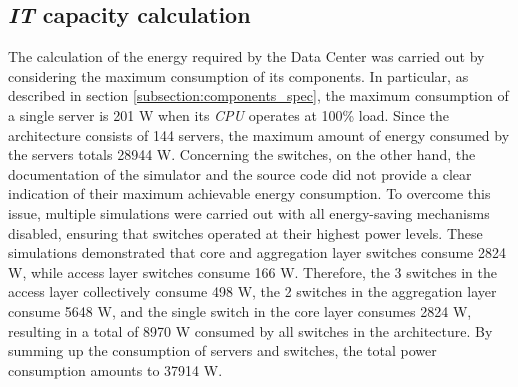 \subsection{\emph{IT} capacity calculation} \label{subsection:it_capacity}
The calculation of the energy required by the Data Center was carried out by considering the maximum consumption of its components. In particular, as described in section \ref{subsection:components_spec}, the maximum consumption of a single server is 201 W when its \emph{CPU} operates at 100\% load. Since the architecture consists of 144 servers, the maximum amount of energy consumed by the servers totals 28944 W. Concerning the switches, on the other hand, the documentation of the simulator and the source code did not provide a clear indication of their maximum achievable energy consumption. To overcome this issue, multiple simulations were carried out with all energy-saving mechanisms disabled, ensuring that switches operated at their highest power levels. These simulations demonstrated that core and aggregation layer switches consume 2824 W, while access layer switches consume 166 W. Therefore, the 3 switches in the access layer collectively consume 498 W, the 2 switches in the aggregation layer consume 5648 W, and the single switch in the core layer consumes 2824 W, resulting in a total of 8970 W consumed by all switches in the architecture. By summing up the consumption of servers and switches, the total power consumption amounts to 37914 W.

